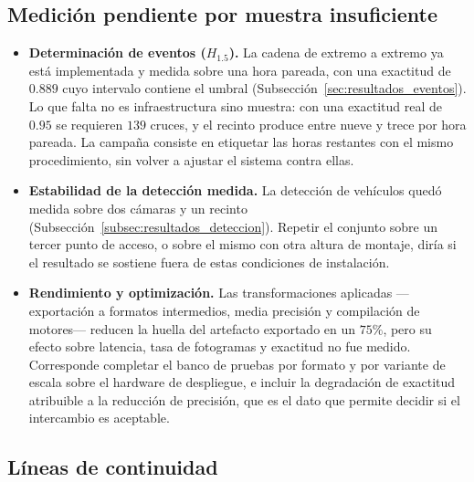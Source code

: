 \subsection{Medición pendiente por muestra insuficiente}

\begin{itemize}
    \item \textbf{Determinación de eventos ($H_{1{.}5}$).} La cadena de extremo a
        extremo ya está implementada y medida sobre una hora pareada, con una
        exactitud de $0{.}889$ cuyo intervalo contiene el umbral
        (Subsección~\ref{sec:resultados_eventos}). Lo que falta no es
        infraestructura sino muestra: con una exactitud real de $0{.}95$ se
        requieren $139$ cruces, y el recinto produce entre nueve y trece por hora
        pareada. La campaña consiste en etiquetar las horas restantes con el mismo
        procedimiento, sin volver a ajustar el sistema contra ellas.

    \item \textbf{Estabilidad de la detección medida.} La detección de vehículos
        quedó medida sobre dos cámaras y un recinto (Subsección~\ref{subsec:resultados_deteccion}).
        Repetir el conjunto sobre un tercer punto de acceso, o sobre el mismo con
        otra altura de montaje, diría si el resultado se sostiene fuera de estas
        condiciones de instalación.

    \item \textbf{Rendimiento y optimización.} Las transformaciones aplicadas
        ---exportación a formatos intermedios, media precisión y compilación de
        motores--- reducen la huella del artefacto exportado en un $75\%$, pero su
        efecto sobre latencia, tasa de fotogramas y exactitud no fue medido.
        Corresponde completar el banco de pruebas por formato y por variante de
        escala sobre el hardware de despliegue, e incluir la degradación de
        exactitud atribuible a la reducción de precisión, que es el dato que
        permite decidir si el intercambio es aceptable.
\end{itemize}

\subsection{Líneas de continuidad}


